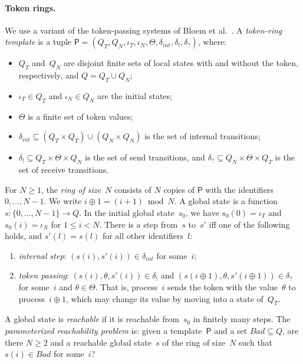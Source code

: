 \documentclass[11pt]{article}
\theoremstyle{definition}
\begin{document}
\paragraph{Token rings.}
We use a variant of the token-passing systems of Bloem et
al.~\cite[Sec.~4.1.2]{BloemEtAl2015}. A \emph{token-ring template} is a
tuple $\mathsf{P} = (Q_T, Q_N, \iota_T, \iota_N, \Theta, \delta_{\mathit{int}},
\delta_!, \delta_?)$, where:
\begin{itemize}
  \item $Q_T$ and~$Q_N$ are disjoint finite sets of local states with and
    without the token, respectively, and $Q = Q_T \cup Q_N$;
  \item $\iota_T \in Q_T$ and $\iota_N \in Q_N$ are the initial states;
  \item $\Theta$ is a finite set of token values;
  \item $\delta_{\mathit{int}} \subseteq (Q_T \times Q_T) \cup
    (Q_N \times Q_N)$ is the set of internal transitions;
  \item $\delta_! \subseteq Q_T \times \Theta \times Q_N$ is the set of send
    transitions, and $\delta_? \subseteq Q_N \times \Theta \times Q_T$ is
    the set of receive transitions.
\end{itemize}
For $N \ge 1$, the \emph{ring of size~$N$} consists of $N$ copies of
$\mathsf{P}$ with the identifiers $0, \dots, N - 1$. We write
$i \oplus 1 = (i + 1) \bmod N$. A global state is a function
$s : \{0, \dots, N - 1\} \to Q$. In the initial global state~$s_0$, we have
$s_0(0) = \iota_T$ and $s_0(i) = \iota_N$ for $1 \le i < N$. There is a
step from~$s$ to~$s'$ iff one of the following holds, and
$s'(l) = s(l)$ for all other identifiers~$l$:
\begin{enumerate}
  \item \emph{internal step}: $(s(i), s'(i)) \in \delta_{\mathit{int}}$ for
    some~$i$;
  \item \emph{token passing}: $(s(i), \theta, s'(i)) \in \delta_!$ and
    $(s(i \oplus 1), \theta, s'(i \oplus 1)) \in \delta_?$ for some~$i$
    and $\theta \in \Theta$. That is, process~$i$ sends the token with the
    value~$\theta$ to process~$i \oplus 1$, which may change its value by
    moving into a state of~$Q_T$.
\end{enumerate}
A global state is \emph{reachable} if it is reachable from~$s_0$ in finitely
many steps. The \emph{parameterized reachability problem} is: given a
template~$\mathsf{P}$ and a set $\mathit{Bad} \subseteq Q$, are there
$N \ge 2$ and a reachable global state~$s$ of the ring of size~$N$ such that
$s(i) \in \mathit{Bad}$ for some~$i$?
\end{document}

